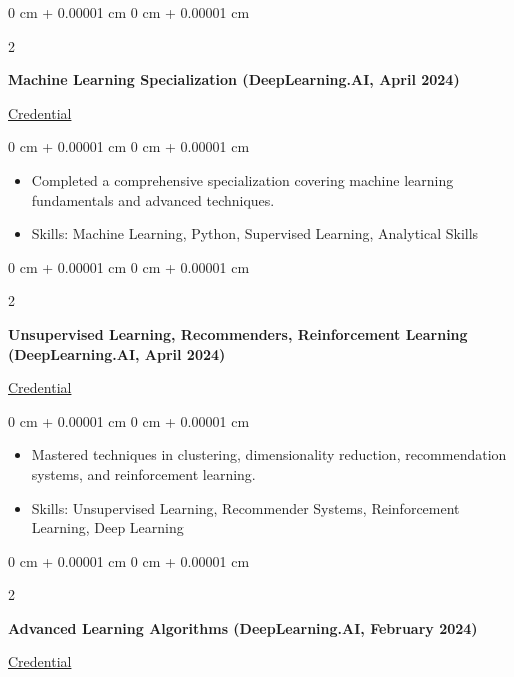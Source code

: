 \documentclass[10pt, letterpaper]{article}
\newenvironment{highlights}{
    \begin{itemize}[
        topsep=0.10 cm,
        parsep=0.10 cm,
        partopsep=0pt,
        itemsep=0pt,
        leftmargin=0 cm + 10pt
    ]
}{
    \end{itemize}
} %
\newenvironment{onecolentry}{
    \begin{adjustwidth}{
        0 cm + 0.00001 cm
    }{
        0 cm + 0.00001 cm
    }
}{
    \end{adjustwidth}
} %
\newenvironment{twocolentry}[2][]{
    \onecolentry
    \def\secondColumn{#2}
    \setcolumnwidth{\fill, 4.5 cm}
    \begin{paracol}{2}
}{
    \switchcolumn \raggedleft \secondColumn
    \end{paracol}
    \endonecolentry
} %
\begin{document}
        \vspace{0.2 cm}
 
        \begin{twocolentry}
            {\href{https://www.coursera.org/account/accomplishments/specialization/BA8N9Y8JDSSN}{Credential}}
            \textbf{Machine Learning Specialization (DeepLearning.AI, April 2024)}
        \end{twocolentry}
        \vspace{0.10 cm}
        
        \begin{onecolentry}
            \begin{highlights}
                \item Completed a comprehensive specialization covering machine learning fundamentals and advanced techniques.
                \item Skills: Machine Learning, Python, Supervised Learning, Analytical Skills
            \end{highlights}
        \end{onecolentry}
        \vspace{0.2 cm}

        \begin{twocolentry}
            {\href{https://www.coursera.org/account/accomplishments/verify/FSHG9XHXRZ35}{Credential}}
            \textbf{Unsupervised Learning, Recommenders, Reinforcement Learning (DeepLearning.AI, April 2024)}
        \end{twocolentry}
        \vspace{0.10 cm}
        
        \begin{onecolentry}
            \begin{highlights}
                \item Mastered techniques in clustering, dimensionality reduction, recommendation systems, and reinforcement learning.
                \item Skills: Unsupervised Learning, Recommender Systems, Reinforcement Learning, Deep Learning
            \end{highlights}
        \end{onecolentry}
        \vspace{0.2 cm}

        \begin{twocolentry}
            {\href{https://www.coursera.org/account/accomplishments/verify/CWGADX38LPCR}{Credential}}
            \textbf{Advanced Learning Algorithms (DeepLearning.AI, February 2024)}
        \end{twocolentry}
        \vspace{0.10 cm}
        
\end{document}
